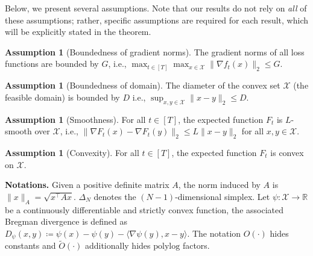 \documentclass{article}
\theoremstyle{plain}
\theoremstyle{definition}
\newtheorem{definition}[theorem]{Definition}
\newtheorem{assumption}[theorem]{Assumption}
\theoremstyle{remark}
\newcommand{\cX}{\mathcal{X}}
\renewcommand{\tilde}{\widetilde}
\begin{document}

Below, we present several assumptions. Note that our results do not rely on \emph{all} of these assumptions; rather, specific assumptions are required for each result, which will be explicitly stated in the theorem.

  

\begin{assumption}[Boundedness of gradient norms]
\label{ass:G}
The gradient norms of all loss functions are bounded by $G$, i.e., $\max_{t\in[T]}\max_{x\in\cX}\|\nabla f_t(x)\|_2\leq G$.
\end{assumption}

\begin{assumption}[Boundedness of domain]
\label{ass:D}
The diameter of the convex set $\cX$ (the feasible domain) is bounded by $D$ i.e., $\sup_{x,y\in \cX}\|x-y\|_2\leq D$.
\end{assumption}

\begin{assumption}[Smoothness]
\label{ass:L}
For all $t\in [T]$, the expected function $F_t$ is $L$-smooth over $\cX$, i.e., $\|\nabla F_t(x)-\nabla F_t(y)\|_2\leq L\|x-y\|_2$ for all $x,y\in\cX$.
\end{assumption}

\begin{assumption}[Convexity]
\label{ass:convexF}
For all $t\in[T]$, the expected function $F_t$ is convex on $\cX$.
\end{assumption}


\textbf{Notations.} Given a positive definite matrix $A$, the   norm induced by $A$ is  $\|x\|_{A}=\sqrt{x^\top Ax}$.  $\Delta_N$ denotes the $(N-1)$-dimensional simplex. Let $\psi: \cX \to \mathbb{R}$ be a continuously differentiable and strictly convex function, the associated Bregman divergence is defined as $D_{\psi}(x, y) \coloneq \psi(x) - \psi(y) - \langle \nabla \psi(y), x-y \rangle$. The notation $O(\cdot)$ hides constants and $\tilde{O}(\cdot)$ additionally hides  $\mathrm{polylog}$ factors.
\end{document}
